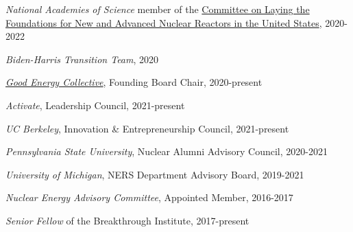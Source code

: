 \textit{National Academies of Science} member of the \href{https://www.nationalacademies.org/our-work/laying-the-foundation-for-new-and-advanced-nuclear-reactors-in-the-united-states#sectionCommittee}{Committee on Laying the
Foundations for New and Advanced Nuclear Reactors in the United States},
2020-2022

\textit{Biden-Harris Transition Team}, 2020

\textit{\href{https://www.goodenergycollective.org/}{Good Energy Collective}},
Founding Board Chair, 2020-present

\textit{Activate}, Leadership Council, 2021-present

\textit{UC Berkeley}, Innovation \&  Entrepreneurship Council, 2021-present

\textit{Pennsylvania State University}, Nuclear Alumni Advisory Council, 2020-2021

\textit{University of Michigan}, NERS Department Advisory Board, 2019-2021


\textit{Nuclear Energy Advisory Committee}, Appointed Member, 2016-2017


\textit{Senior Fellow} of the Breakthrough Institute, 2017-present

